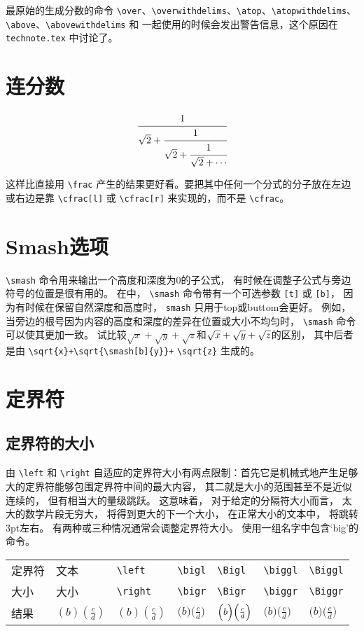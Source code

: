 最原始的生成分数的命令 \verb|\over|、\verb|\overwithdelims|、\verb|\atop|、\verb|\atopwithdelims|、\verb|\above|、\verb|\abovewithdelims| 和  一起使用的时候会发出警告信息，这个原因在 \verb|technote.tex| 中讨论了。
\section{连分数}
\begin{listing}
\begin{equation}
\cfrac{1}{\sqrt{2}+
 \cfrac{1}{\sqrt{2}+
  \cfrac{1}{\sqrt{2}+\dotsb
 }}}
\end{equation}
\end{listing}

这样比直接用 \verb|\frac| 产生的结果更好看。要把其中任何一个分式的分子放在左边或右边是靠 \verb|\cfrac[l]| 或 \verb|\cfrac[r]| 来实现的，而不是 \verb|\cfrac|。
\section{Smash选项}
\verb|\smash| 命令用来输出一个高度和深度为0的子公式，  有时候在调整子公式与旁边符号的位置是很有用的。 在中，  \verb|\smash| 命令带有一个可选参数 \verb|[t]| 或 \verb|[b]|，  因为有时候在保留自然深度和高度时，  \verb|smash| 只用于top或buttom会更好。 例如，  当旁边的根号因为内容的高度和深度的差异在位置或大小不均匀时，  \verb|\smash| 命令可以使其更加一致。 试比较$\sqrt x+\sqrt y+\sqrt z$和$\sqrt {x}+\sqrt{\smash[b]{y}}+\sqrt{z}$的区别，  其中后者是由 \verb|\sqrt{x}+\sqrt{\smash[b]{y}}+| \verb|\sqrt{z}| 生成的。
\section{定界符}
\subsection{定界符的大小}
由 \verb|\left| 和 \verb|\right| 自适应的定界符大小有两点限制：首先它是机械式地产生足够大的定界符能够包围定界符中间的最大内容，  其二就是大小的范围甚至不是近似连续的，  但有相当大的量级跳跃。 这意味着，  对于给定的分隔符大小而言，  太大的数学片段无穷大，  将得到更大的下一个大小，  在正常大小的文本中，  将跳转3pt左右。 有两种或三种情况通常会调整定界符大小。 使用一组名字中包含`big'的命令。

\begin{tabular}{l|llllll}
定界符 &文本&\verb|\left|&\verb|\bigl|&\verb|\Bigl|&\verb|\biggl|&\verb|\Biggl|\\
大小&大小     &\verb|\right|&\verb|\bigr|&\verb|\Bigr|&\verb|\biggr|&\verb|\Biggr|\\
\hline
结果&$(b)(\frac cd)$&$\left(b\right)\left(\frac cd\right)$&$\bigl(b\bigr)\bigl(\frac cd\bigr)$&$\Bigl(b\Bigr)\Bigl(\frac cd\Bigr)$&$\biggl(b\biggr)\biggl(\frac cd\biggr)$
&$\Biggl(b\Biggr)\Biggl(\frac cd\Biggr)$
\end{tabular}

